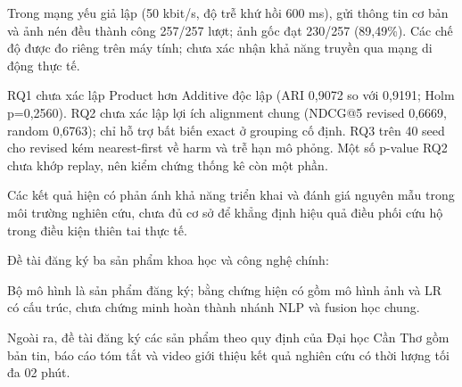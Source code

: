 Trong mạng yếu giả lập (50 kbit/s, độ trễ khứ hồi 600 ms), gửi thông tin cơ bản và ảnh nén đều thành công 257/257 lượt; ảnh gốc đạt 230/257 (89,49\%). Các chế độ được đo riêng trên máy tính; chưa xác nhận khả năng truyền qua mạng di động thực tế.

RQ1 chưa xác lập Product hơn Additive độc lập (ARI 0,9072 so với 0,9191; Holm p=0,2560). RQ2 chưa xác lập lợi ích alignment chung (NDCG@5 revised 0,6669, random 0,6763); chỉ hỗ trợ bất biến exact ở grouping cố định. RQ3 trên 40 seed cho revised kém nearest-first về harm và trễ hạn mô phỏng. Một số p-value RQ2 chưa khớp replay, nên kiểm chứng thống kê còn một phần.

Các kết quả hiện có phản ánh khả năng triển khai và đánh giá nguyên mẫu trong môi trường nghiên cứu, chưa đủ cơ sở để khẳng định hiệu quả điều phối cứu hộ trong điều kiện thiên tai thực tế.

Đề tài đăng ký ba sản phẩm khoa học và công nghệ chính:
\par\noindent Bộ mô hình là sản phẩm đăng ký; bằng chứng hiện có gồm mô hình ảnh và LR có cấu trúc, chưa chứng minh hoàn thành nhánh NLP và fusion học chung.
\par\noindent Ngoài ra, đề tài đăng ký các sản phẩm theo quy định của Đại học Cần Thơ gồm bản tin, báo cáo tóm tắt và video giới thiệu kết quả nghiên cứu có thời lượng tối đa 02 phút.

